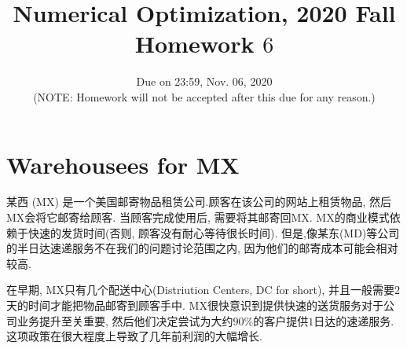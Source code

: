 \documentclass[10pt]{article}
\begin{document}
	
\title{	Numerical Optimization, 2020 Fall\\Homework $6$}
\date{Due on 23:59, Nov. 06, 2020 \\(NOTE: Homework will not be accepted after this due for any reason.)\\}
\maketitle
\section{\textbf{Warehousees for MX}}
某西 (MX) 是一个美国邮寄物品租赁公司.顾客在该公司的网站上租赁物品, 然后MX会将它邮寄给顾客. 当顾客完成使用后, 需要将其邮寄回MX. MX的商业模式依赖于快速的发货时间(否则, 顾客没有耐心等待很长时间). 但是,像某东(MD)等公司的半日达速递服务不在我们的问题讨论范围之内, 因为他们的邮寄成本可能会相对较高.

在早期, MX只有几个配送中心(Distriution Centers, DC for short), 并且一般需要$2$天的时间才能把物品邮寄到顾客手中. MX很快意识到提供快速的送货服务对于公司业务提升至关重要, 然后他们决定尝试为大约$90\%$的客户提供$1$日达的速递服务. 这项政策在很大程度上导致了几年前利润的大幅增长.
\end{document}
